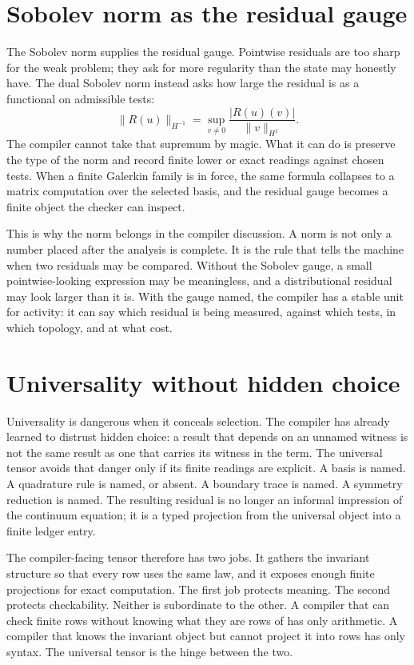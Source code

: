 \section{Sobolev norm as the residual gauge}
\label{se:sobolev-residual-gauge}

The Sobolev norm supplies the residual gauge. Pointwise residuals are too sharp for the weak problem; they
ask for more regularity than the state may honestly have. The dual Sobolev norm instead asks how large the
residual is as a functional on admissible tests:
\[
  \|R(u)\|_{H^{-1}}
    =
  \sup_{v\ne 0}
    \frac{|R(u)(v)|}{\|v\|_{H^1}} .
\]
The compiler cannot take that supremum by magic. What it can do is preserve the type of the norm and
record finite lower or exact readings against chosen tests. When a finite Galerkin family is in force, the
same formula collapses to a matrix computation over the selected basis, and the residual gauge becomes a
finite object the checker can inspect.

This is why the norm belongs in the compiler discussion. A norm is not only a number placed after the
analysis is complete. It is the rule that tells the machine when two residuals may be compared. Without the
Sobolev gauge, a small pointwise-looking expression may be meaningless, and a distributional residual may
look larger than it is. With the gauge named, the compiler has a stable unit for activity: it can say which
residual is being measured, against which tests, in which topology, and at what cost.

\section{Universality without hidden choice}
\label{se:universality-without-hidden-choice}

Universality is dangerous when it conceals selection. The compiler has already learned to distrust hidden
choice: a result that depends on an unnamed witness is not the same result as one that carries its witness
in the term. The universal tensor avoids that danger only if its finite readings are explicit. A basis is
named. A quadrature rule is named, or absent. A boundary trace is named. A symmetry reduction is named. The
resulting residual is no longer an informal impression of the continuum equation; it is a typed projection
from the universal object into a finite ledger entry.

The compiler-facing tensor therefore has two jobs. It gathers the invariant structure so that every row
uses the same law, and it exposes enough finite projections for exact computation. The first job protects
meaning. The second protects checkability. Neither is subordinate to the other. A compiler that can check
finite rows without knowing what they are rows of has only arithmetic. A compiler that knows the invariant
object but cannot project it into rows has only syntax. The universal tensor is the hinge between the two.
